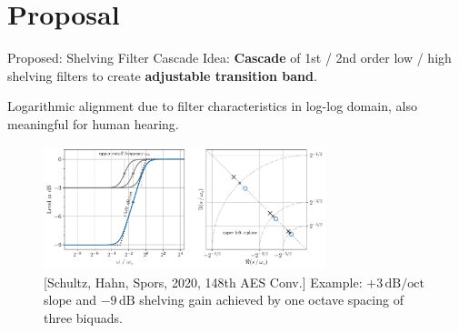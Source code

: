 \documentclass[mathserif,aspectratio=169]{beamer}
\newcommand{\tw}{0.73}
\begin{document}
\section{Proposal}
\begin{frame}{Proposed: Shelving Filter Cascade}
Idea: \textbf{Cascade} of 1st / 2nd order low / high shelving filters to create
\textbf{adjustable transition band}.

Logarithmic alignment due to filter characteristics in log-log domain, also
meaningful for human hearing.
\begin{figure}
\captionsetup{width=.6\linewidth}
\includegraphics[width=\tw\textwidth]{../graphics/biquad-and-pzmap_slides.pdf}
\caption{[Schultz, Hahn, Spors, 2020, 148th AES Conv.]
Example: $+3\,\mathrm{dB/oct}$ slope and $-9\,\mathrm{dB}$ shelving gain
achieved by one octave spacing of three biquads.}
\label{fig:biquad-and-pzmap}
\end{figure}
\end{frame}
%
%
%
\end{document}
